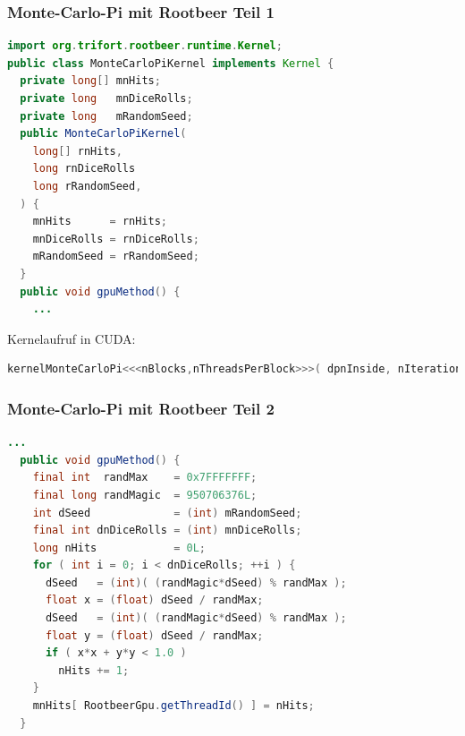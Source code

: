 \begin{frame}[fragile]
    \frametitle{Monte-Carlo-Pi mit Rootbeer Teil 1}
    \begin{lstlisting}[language=Java]
import org.trifort.rootbeer.runtime.Kernel;
public class MonteCarloPiKernel implements Kernel {
  private long[] mnHits;
  private long   mnDiceRolls;
  private long   mRandomSeed;
  public MonteCarloPiKernel(
    long[] rnHits,
    long rnDiceRolls
    long rRandomSeed,
  ) {
    mnHits      = rnHits;
    mnDiceRolls = rnDiceRolls;
    mRandomSeed = rRandomSeed;
  }
  public void gpuMethod() {
    ...
\end{lstlisting}\vspace{-1.5\baselineskip}
Kernelaufruf in CUDA:
\begin{lstlisting}[language=C++]
kernelMonteCarloPi<<<nBlocks,nThreadsPerBlock>>>( dpnInside, nIterationsPerThread, seed );
\end{lstlisting}
\end{frame}


\begin{frame}[fragile]
    \frametitle{Monte-Carlo-Pi mit Rootbeer Teil 2}
    \begin{lstlisting}[language=Java]
  ...
  public void gpuMethod() {
    final int  randMax    = 0x7FFFFFFF;
    final long randMagic  = 950706376L;
    int dSeed             = (int) mRandomSeed;
    final int dnDiceRolls = (int) mnDiceRolls;
    long nHits            = 0L;
    for ( int i = 0; i < dnDiceRolls; ++i ) {
      dSeed   = (int)( (randMagic*dSeed) % randMax );
      float x = (float) dSeed / randMax;
      dSeed   = (int)( (randMagic*dSeed) % randMax );
      float y = (float) dSeed / randMax;
      if ( x*x + y*y < 1.0 )
        nHits += 1;
    }
    mnHits[ RootbeerGpu.getThreadId() ] = nHits;
  }
\end{lstlisting}\vspace{-1.5\baselineskip}
\end{frame}


